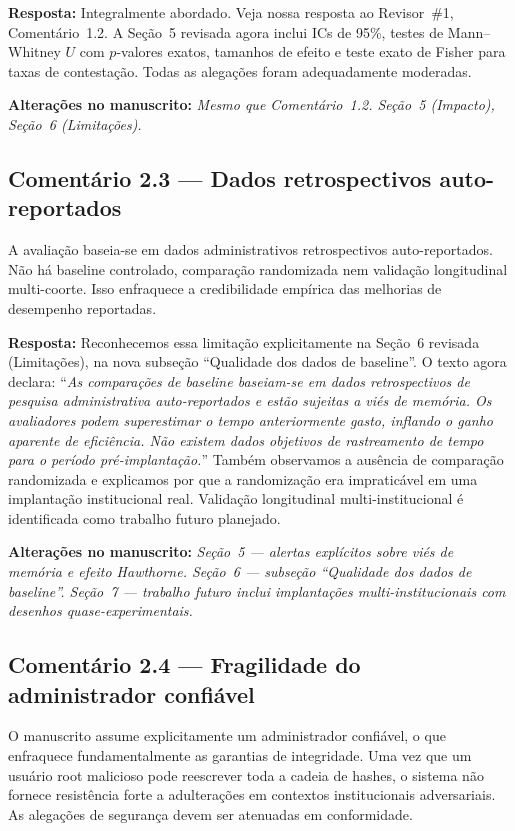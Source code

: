 \documentclass[11pt,a4paper]{article}
\newcommand{\response}[1]{\par\noindent\textcolor{responsecolor}{\textbf{Resposta:}} #1}
\newcommand{\change}[1]{\par\noindent\textcolor{changecolor}{\textbf{Alterações no manuscrito:}} \textit{#1}}
\begin{document}
\response{Integralmente abordado. Veja nossa resposta ao Revisor~\#1, Comentário~1.2. A Seção~5 revisada agora inclui ICs de 95\%, testes de Mann--Whitney $U$ com $p$-valores exatos, tamanhos de efeito e teste exato de Fisher para taxas de contestação. Todas as alegações foram adequadamente moderadas.}

\change{Mesmo que Comentário~1.2. Seção~5 (Impacto), Seção~6 (Limitações).}

\bigskip

\subsection*{Comentário 2.3 --- Dados retrospectivos auto-reportados}

\begin{reviewerbox}
A avaliação baseia-se em dados administrativos retrospectivos auto-reportados. Não há baseline controlado, comparação randomizada nem validação longitudinal multi-coorte. Isso enfraquece a credibilidade empírica das melhorias de desempenho reportadas.
\end{reviewerbox}

\response{Reconhecemos essa limitação explicitamente na Seção~6 revisada (Limitações), na nova subseção ``Qualidade dos dados de baseline''. O texto agora declara: ``\textit{As comparações de baseline baseiam-se em dados retrospectivos de pesquisa administrativa auto-reportados e estão sujeitas a viés de memória. Os avaliadores podem superestimar o tempo anteriormente gasto, inflando o ganho aparente de eficiência. Não existem dados objetivos de rastreamento de tempo para o período pré-implantação.}'' Também observamos a ausência de comparação randomizada e explicamos por que a randomização era impraticável em uma implantação institucional real. Validação longitudinal multi-institucional é identificada como trabalho futuro planejado.}

\change{Seção~5 --- alertas explícitos sobre viés de memória e efeito Hawthorne. Seção~6 --- subseção ``Qualidade dos dados de baseline''. Seção~7 --- trabalho futuro inclui implantações multi-institucionais com desenhos quase-experimentais.}

\bigskip

\subsection*{Comentário 2.4 --- Fragilidade do administrador confiável}

\begin{reviewerbox}
O manuscrito assume explicitamente um administrador confiável, o que enfraquece fundamentalmente as garantias de integridade. Uma vez que um usuário root malicioso pode reescrever toda a cadeia de hashes, o sistema não fornece resistência forte a adulterações em contextos institucionais adversariais. As alegações de segurança devem ser atenuadas em conformidade.
\end{reviewerbox}
\end{document}
